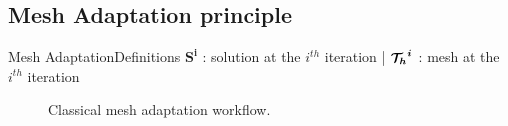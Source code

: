 \subsection{Mesh Adaptation principle}

\begin{frame}{Mesh Adaptation}{Definitions}
  $\boldsymbol{S^i}$ : solution at the $i^{th}$ iteration |
  $\boldsymbol{{\mathcal{T}_h}^i}$ : mesh at the $i^{th}$ iteration
  \vspace{0.5cm}
   \begin{figure}
        \caption{Classical mesh adaptation workflow.}
   \end{figure}
\end{frame}


